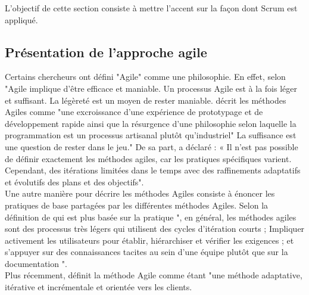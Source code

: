 L'objectif de cette section consiste à mettre l'accent sur la façon dont Scrum est appliqué. 
\subsection{Présentation de l’approche agile}
Certains chercheurs ont défini "Agile" comme une philosophie. En effet, selon\\ \cite{highsmith2001agile}"Agile implique d'être efficace et maniable. Un processus Agile est à la fois léger et suffisant. La légèreté est un moyen de rester maniable. \cite{boehm2004balancing} décrit les méthodes Agiles comme "une excroissance d'une expérience de prototypage et de développement rapide ainsi que la résurgence d'une philosophie selon laquelle la programmation est un processus artisanal plutôt qu'industriel"
La suffisance est une question de rester dans le jeu." De sa part, \cite{larman2004agile} a déclaré : « Il n'est pas possible de définir exactement les méthodes agiles, car les pratiques spécifiques varient. Cependant, des itérations limitées dans le temps avec des raffinements adaptatifs et évolutifs des plans et des objectifs".\\
Une autre manière pour décrire les méthodes Agiles consiste à énoncer les pratiques de base partagées par les différentes méthodes Agiles. Selon la définition de \cite{boehm2004balancing} qui est plus basée sur la pratique ",  en général, les méthodes agiles sont des processus très légers qui utilisent des cycles d'itération courts ; Impliquer activement les utilisateurs pour établir, hiérarchiser et vérifier les exigences ; et s'appuyer sur des connaissances tacites au sein d'une équipe plutôt que sur la documentation ".\\
Plus récemment, \cite{abbas2008historical} définit la méthode Agile comme étant "une méthode adaptative, itérative et incrémentale et orientée vers les clients.
